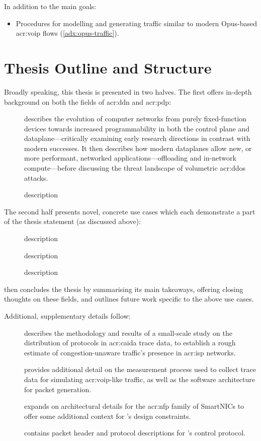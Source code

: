 In addition to the main goals:
\begin{itemize}
	\item Procedures for modelling and generating traffic similar to modern Opus-based \gls{acr:voip} flows (\cref{adx:opus-traffic}).
\end{itemize}

\section{Thesis Outline and Structure}
Broadly speaking, this thesis is presented in two halves.
The first offers in-depth background on both the fields of \gls{acr:ddn} and \gls{acr:pdp}:
\begin{description}
	\item[] describes the evolution of computer networks from purely fixed-function devices towards increased programmability in both the control plane and dataplane---critically examining early research directions in contrast with modern successes. It then describes how modern dataplanes allow new, or more performant, networked applications---offloading and in-network compute---before discussing the threat landscape of volumetric \gls{acr:ddos} attacks.
	\item[] description
\end{description}
The second half presents novel, concrete use cases which each demonstrate a part of the thesis statement (as discussed above):
\begin{description}
	\item[] description
	\item[] description
	\item[] description
\end{description}
 then concludes the thesis by summarising its main takeaways, offering closing thoughts on these fields, and outlines future work specific to the above use cases.

Additional, supplementary details follow:
\begin{description}
	\item[] describes the methodology and results of a small-scale study on the distribution of protocols in \gls{acr:caida} trace data, to establish a rough estimate of congestion-unaware traffic's presence in \gls{acr:isp} networks.
	\item[] provides additional detail on the measurement process used to collect trace data for simulating \gls{acr:voip}-like traffic, as well as the software architecture for packet generation.
	\item[] expands on architectural details for the \gls{acr:nfp} family of SmartNICs to offer some additional context for \approachshort{}'s design constraints.
	\item[] contains packet header and protocol descriptions for \approachshort{}'s control protocol.
\end{description}